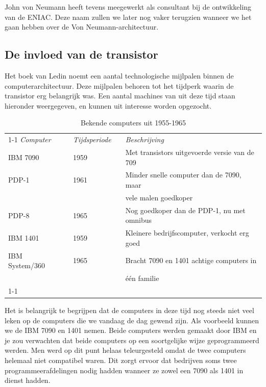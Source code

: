 John von Neumann heeft tevens meegewerkt als consultant bij de ontwikkeling van de ENIAC. Deze naam zullen we later nog vaker terugzien wanneer we het gaan hebben over de Von Neumann-architectuur.

\subsection{De invloed van de transistor}



Het boek van Ledin noemt een aantal technologische mijlpalen binnen de computerarchitectuur. Deze mijlpalen behoren tot het tijdperk waarin de transistor erg belangrijk was. Een aantal machines van uit deze tijd staan hieronder weergegeven, en kunnen uit interesse worden opgezocht.

\begin{table}[!htbp]
\caption{Bekende computers uit 1955-1965}
\label{table:computers55-65}
\small
\begin{tabular}{ l l l l l}
    \cline {1-1} \cline{3-3} \cline{5-5}
    \emph{Computer} & & \emph{Tijdsperiode} & & \emph{Beschrijving}\\
    IBM 7090 &&  1959 && Met transistors uitgevoerde versie van de 709 \\
    PDP-1    && 1961 && Minder snelle computer dan de 7090, maar \\
    && && vele malen goedkoper\\
    PDP-8   && 1965 && Nog goedkoper dan de PDP-1, nu met omnibus\\
    IBM 1401 && 1959 && Kleinere bedrijfscomputer, verkocht erg goed\\
    IBM System/360 && 1965 && Bracht 7090 en 1401 achtige computers in \\
    && && één familie\\
    \cline {1-1} \cline{3-3} \cline{5-5}
\end{tabular}
\end{table}

Het is belangrijk te begrijpen dat de computers in deze tijd nog steeds niet veel leken op de computers die we vandaag de dag gewend zijn. Als voorbeeld kunnen we de IBM 7090 en 1401 nemen. Beide computers werden gemaakt door IBM en je zou verwachten dat beide computers op een soortgelijke wijze geprogrammeerd werden. Men werd op dit punt helaas teleurgesteld omdat de twee computers helemaal niet compatibel waren. Dit zorgt ervoor dat bedrijven soms twee programmeerafdelingen nodig hadden wanneer ze zowel een 7090 als 1401 in dienst hadden.

